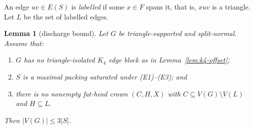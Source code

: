 \documentclass[11pt]{article}
\newtheorem{lemma}[theorem]{Lemma}
\theoremstyle{definition}
\begin{document}
An edge $uv\in E(S)$ is \emph{labelled} if some $x\in F$ spans it, that is,
$xuv$ is a triangle.  Let $L$ be the set of labelled edges.

\begin{lemma}[discharge bound]\label{lem:discharge}
Let $G$ be triangle-supported and split-normal.  Assume that:
\begin{enumerate}[label=(\alph*)]
  \item $G$ has no triangle-isolated $K_4$ edge block as in
        Lemma~\ref{lem:k4-offset};
  \item $S$ is a maximal packing saturated under (E1)--(E3); and
  \item there is no nonempty fat-head crown $(C,H,X)$ with
        $C\subseteq V(G)\setminus V(L)$ and $H\subseteq L$.
\end{enumerate}
Then $|V(G)|\leq 3|S|$.
\end{lemma}
\end{document}
